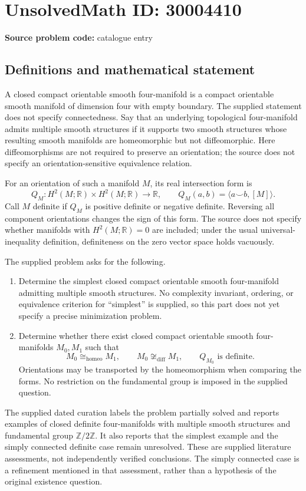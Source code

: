 \documentclass[11pt]{article}
\newcommand{\Z}{\mathbb{Z}}
\newcommand{\R}{\mathbb{R}}
\begin{document}
\section*{UnsolvedMath ID: 30004410}
\textbf{Source problem code:} catalogue entry
\subsection{Definitions and mathematical statement}
A closed compact orientable smooth four-manifold is a compact orientable smooth manifold of dimension four with empty boundary. The supplied statement does not specify connectedness. Say that an underlying topological four-manifold admits multiple smooth structures if it supports two smooth structures whose resulting smooth manifolds are homeomorphic but not diffeomorphic. Here diffeomorphisms are not required to preserve an orientation; the source does not specify an orientation-sensitive equivalence relation.

For an orientation of such a manifold \(M\), its real intersection form is
\[
Q_M\colon H^2(M;\R)\times H^2(M;\R)\longrightarrow\R,
\qquad Q_M(a,b)=\langle a\smile b,[M]\rangle.
\]
Call \(M\) definite if \(Q_M\) is positive definite or negative definite. Reversing all component orientations changes the sign of this form. The source does not specify whether manifolds with \(H^2(M;\R)=0\) are included; under the usual universal-inequality definition, definiteness on the zero vector space holds vacuously.

The supplied problem asks for the following.
\begin{enumerate}
\item Determine the simplest closed compact orientable smooth four-manifold admitting multiple smooth structures. No complexity invariant, ordering, or equivalence criterion for ``simplest'' is supplied, so this part does not yet specify a precise minimization problem.
\item Determine whether there exist closed compact orientable smooth four-manifolds \(M_0,M_1\) such that
\[
M_0\cong_{\mathrm{homeo}}M_1,
\qquad M_0\not\cong_{\mathrm{diff}}M_1,
\qquad Q_{M_0}\text{ is definite}.
\]
Orientations may be transported by the homeomorphism when comparing the forms. No restriction on the fundamental group is imposed in the supplied question.
\end{enumerate}

The supplied dated curation labels the problem partially solved and reports examples of closed definite four-manifolds with multiple smooth structures and fundamental group \(\Z/2\Z\). It also reports that the simplest example and the simply connected definite case remain unresolved. These are supplied literature assessments, not independently verified conclusions. The simply connected case is a refinement mentioned in that assessment, rather than a hypothesis of the original existence question.
\end{document}
